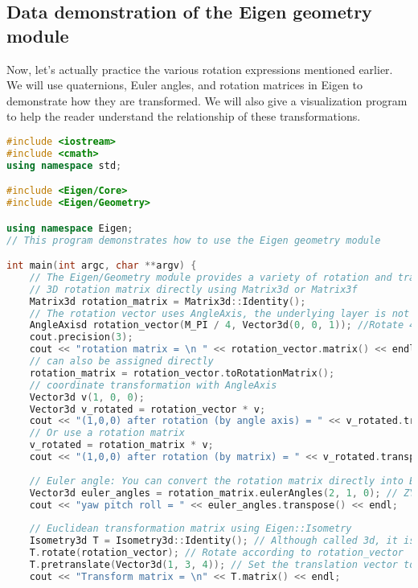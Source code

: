 \subsection{Data demonstration of the Eigen geometry module}

Now, let's actually practice the various rotation expressions mentioned earlier. We will use quaternions, Euler angles, and rotation matrices in Eigen to demonstrate how they are transformed. We will also give a visualization program to help the reader understand the relationship of these transformations.

\begin{lstlisting}[language=c++,caption=slambook2/ch3/useGeometry/useGeometry.cpp]
#include <iostream>
#include <cmath>
using namespace std;

#include <Eigen/Core>
#include <Eigen/Geometry>

using namespace Eigen;
// This program demonstrates how to use the Eigen geometry module

int main(int argc, char **argv) {
    // The Eigen/Geometry module provides a variety of rotation and translation representations
    // 3D rotation matrix directly using Matrix3d or Matrix3f
    Matrix3d rotation_matrix = Matrix3d::Identity();
    // The rotation vector uses AngleAxis, the underlying layer is not directly Matrix, but the operation can be treated as a matrix (because the operator is overloaded)
    AngleAxisd rotation_vector(M_PI / 4, Vector3d(0, 0, 1)); //Rotate 45 degrees along the Z axis
    cout.precision(3);
    cout << "rotation matrix = \n " << rotation_vector.matrix() << endl; //convert to matrix with matrix()
    // can also be assigned directly
    rotation_matrix = rotation_vector.toRotationMatrix();
    // coordinate transformation with AngleAxis
    Vector3d v(1, 0, 0);
    Vector3d v_rotated = rotation_vector * v;
    cout << "(1,0,0) after rotation (by angle axis) = " << v_rotated.transpose() << endl;
    // Or use a rotation matrix
    v_rotated = rotation_matrix * v;
    cout << "(1,0,0) after rotation (by matrix) = " << v_rotated.transpose() << endl;
    
    // Euler angle: You can convert the rotation matrix directly into Euler angles
    Vector3d euler_angles = rotation_matrix.eulerAngles(2, 1, 0); // ZYX order, ie roll pitch yaw order
    cout << "yaw pitch roll = " << euler_angles.transpose() << endl;
    
    // Euclidean transformation matrix using Eigen::Isometry
    Isometry3d T = Isometry3d::Identity(); // Although called 3d, it is essentially a 4*4 matrix
    T.rotate(rotation_vector); // Rotate according to rotation_vector
    T.pretranslate(Vector3d(1, 3, 4)); // Set the translation vector to (1,3,4)
    cout << "Transform matrix = \n" << T.matrix() << endl;
    

\end{lstlisting}
